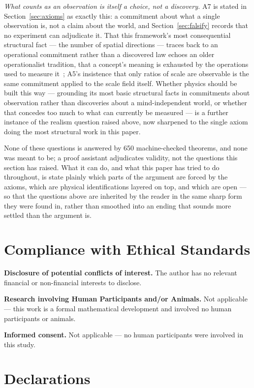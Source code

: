 \documentclass[pdflatex,sn-mathphys-num]{sn-jnl}
\theoremstyle{thmstyleone}
\theoremstyle{thmstylethree}
\theoremstyle{thmstyletwo}
\begin{document}
\emph{What counts as an observation is itself a choice, not a
discovery.} A7 is stated in Section~\ref{sec:axioms} as exactly this: a
commitment about what a single observation is, not a claim about the
world, and Section~\ref{sec:falsify} records that no experiment can
adjudicate it. That this framework's most consequential structural fact
— the number of spatial directions — traces back to an operational
commitment rather than a discovered law echoes an older operationalist
tradition, that a concept's meaning is exhausted by the operations used
to measure it~\cite{Bridgman1927}; A5's insistence that only ratios of
scale are observable is the same commitment applied to the scale field
itself. Whether physics should be built this way — grounding its most
basic structural facts in commitments about observation rather than
discoveries about a mind-independent world, or whether that concedes too
much to what can currently be measured — is a further instance of the
realism question raised above, now sharpened to the single axiom doing
the most structural work in this paper.

None of these questions is answered by 650 machine-checked theorems, and
none was meant to be; a proof assistant adjudicates validity, not the
questions this section has raised. What it can do, and what this paper
has tried to do throughout, is state plainly which parts of the argument
are forced by the axioms, which are physical identifications layered on
top, and which are open — so that the questions above are inherited by
the reader in the same sharp form they were found in, rather than
smoothed into an ending that sounds more settled than the argument is.

\backmatter

\section*{Compliance with Ethical Standards}

\textbf{Disclosure of potential conflicts of interest.} The author has
no relevant financial or non-financial interests to disclose.

\textbf{Research involving Human Participants and/or Animals.} Not
applicable — this work is a formal mathematical development and involved
no human participants or animals.

\textbf{Informed consent.} Not applicable — no human participants were
involved in this study.

\section*{Declarations}
\end{document}
